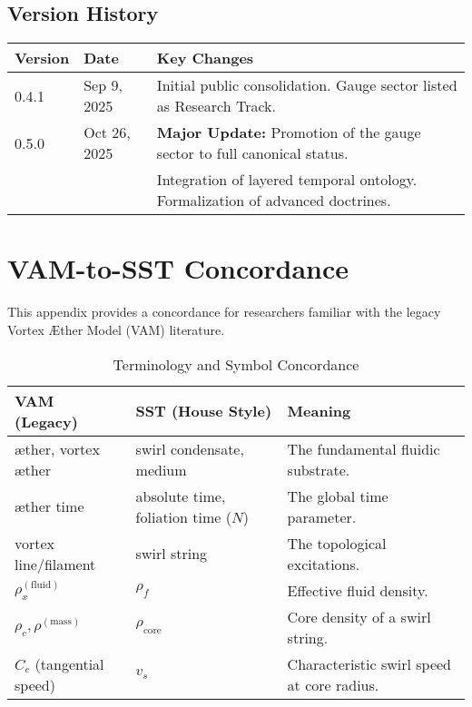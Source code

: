 \documentclass[11pt]{article}
\newcommand{\rhof}{\rho_{\!f}}
\newcommand{\rhocore}{\rho_{\mathrm{core}}}
\newcommand{\vscore}{v_{s}}
\begin{document}
\subsection{Version History}
    \begin{table}[h!]
    \centering
    \begin{tabular}{@{}lll@{}}
    \toprule
    \textbf{Version} & \textbf{Date} & \textbf{Key Changes} \\
    \midrule
    0.4.1 & Sep 9, 2025 & Initial public consolidation. Gauge sector listed as Research Track. \\
    0.5.0 & Oct 26, 2025 & \textbf{Major Update:} Promotion of the gauge sector to full canonical status. \\
    & & Integration of layered temporal ontology. Formalization of advanced doctrines. \\
    \bottomrule
    \end{tabular}
    \end{table}

\section{VAM-to-SST Concordance}
This appendix provides a concordance for researchers familiar with the legacy Vortex Æther Model (VAM) literature.
\begin{table}[h!]
\centering
\caption{Terminology and Symbol Concordance}
\begin{tabular}{@{}lll@{}}
\toprule
\textbf{VAM (Legacy)} & \textbf{SST (House Style)} & \textbf{Meaning} \\
\midrule
æther, vortex æther & swirl condensate, medium & The fundamental fluidic substrate. \\
æther time & absolute time, foliation time ($N$) & The global time parameter. \\
vortex line/filament & swirl string & The topological excitations. \\
$\rho_x^{(\text{fluid})}$ & $\rhof$ & Effective fluid density. \\
$\rho_c, \rho^{(\text{mass})}$ & $\rhocore$ & Core density of a swirl string. \\
$C_c$ (tangential speed) & $\vscore$ & Characteristic swirl speed at core radius. \\
\bottomrule
\end{tabular}
\end{table}
\end{document}
